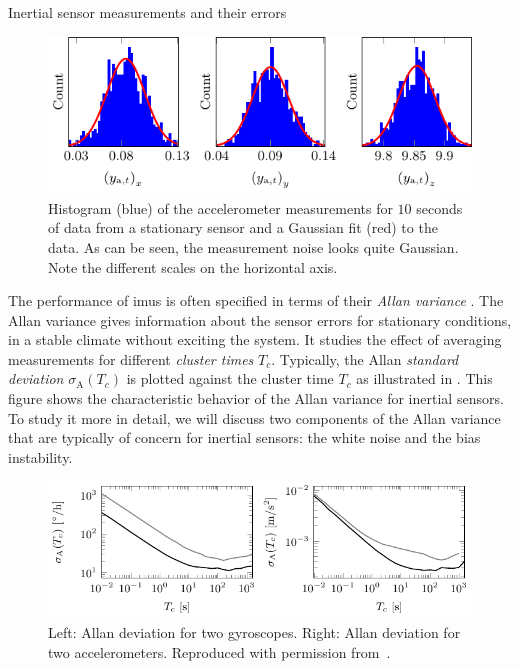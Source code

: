 \begin{myexample}{Inertial sensor measurements and their errors}
\begin{figure}
	\centering
    	\includegraphics[scale = 1]{figure2_4.pdf}
    	\caption{Histogram (blue) of the accelerometer measurements for $10$ seconds of data from a stationary sensor and a Gaussian fit (red) to the data. As can be seen, the measurement noise looks quite Gaussian. Note the different scales on the horizontal axis.}
	\label{fig:sensors-accMeasNoiseHist}
\end{figure}
\end{myexample}

The performance of \glspl{imu} is often specified in terms of their \emph{Allan variance} \citep{ieeeStd1559:2009,elsheimy:2008,allan:1966}. The Allan variance gives information about the sensor errors for stationary conditions, \ie in a stable climate without exciting the system. It studies the effect of averaging measurements for different \emph{cluster times} $T_c$. Typically, the Allan \emph{standard deviation} $\sigma_\text{A}(T_c)$ is plotted against the cluster time $T_c$ as illustrated in . This figure shows the characteristic behavior of the Allan variance for inertial sensors. To study it more in detail, we will discuss two components of the Allan variance that are typically of concern for inertial sensors: the white noise and the bias instability. 

\begin{figure}
	\centering
    	\includegraphics[scale = 1]{figure2_5.pdf}
    	\caption{Left: Allan deviation for two gyroscopes. Right: Allan deviation for two accelerometers. Reproduced with permission from~\cite{vydhyanathanBLS:2015}.}
	\label{fig:sensors-allanVariance}
\end{figure}

